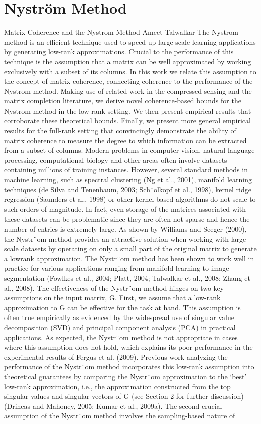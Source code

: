 \section{Nystr\"{o}m Method}
Matrix Coherence and the Nystrom Method Ameet Talwalkar
The Nystrom method is an efficient technique used to speed up large-scale learning applications by generating low-rank approximations. Crucial to the performance of this technique is the assumption that a matrix can be well approximated by working exclusively with a subset of its columns. In this work we relate this assumption to the concept of matrix coherence, connecting coherence to the performance of the Nystrom method. Making use of related work in the compressed sensing and the matrix completion literature, we derive novel coherence-based bounds for the     Nystrom method in the low-rank setting. We then present empirical results that corroborate these theoretical bounds. Finally, we present more general empirical results for the full-rank setting that convincingly demonstrate the ability of matrix coherence to measure the degree to which information can be extracted from a subset of columns. Modern problems in computer vision, natural language processing, computational biology and other areas often involve datasets containing millions of training instances. However, several standard methods in machine learning, such as spectral clustering (Ng et al., 2001), manifold learning techniques (de Silva and Tenenbaum, 2003; Sch¨olkopf et al., 1998), kernel ridge regression (Saunders et al., 1998) or other kernel-based algorithms do not scale to such orders of magnitude. In fact, even storage of the matrices associated with these datasets can be problematic since they are often not sparse and hence the number of entries is extremely large. As shown by Williams and Seeger (2000), the Nystr¨om method provides an attractive solution when working with large-scale datasets by operating on only a small part of the original matrix to generate a lowrank approximation. The Nystr¨om method has been shown to work well in practice for various applications ranging from manifold learning to image segmentation (Fowlkes et al., 2004; Platt, 2004; Talwalkar et al., 2008; Zhang et al., 2008). The effectiveness of the Nystr¨om method hinges on two key assumptions on the input matrix, G. First, we assume that a low-rank approximation to G can be effective for the task at hand. This assumption is often true empirically as evidenced by the widespread use of singular value decomposition (SVD) and principal component analysis (PCA) in practical applications.  As expected, the Nystr¨om method is not appropriate in cases where this assumption does not hold, which explains its poor performance in the experimental results of Fergus et al. (2009). Previous work analyzing the performance of the Nystr¨om method incorporates this low-rank assumption into theoretical guarantees by comparing the Nystr¨om approximation to the ‘best’ low-rank approximation, i.e., the approximation constructed from the top singular values and singular vectors of G (see Section 2 for further discussion) (Drineas and Mahoney, 2005; Kumar et al., 2009a). The second crucial assumption of the Nystr¨om method involves the sampling-based nature of 